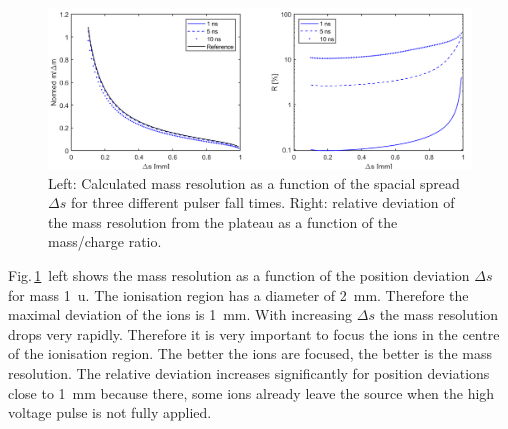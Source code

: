 	\begin{figure}[h!] %
		\centering
		\includegraphics[width=\textwidth]{Bilder/PulseSimPosition.png}
		\caption{Left: Calculated mass resolution as a function of the spacial spread $\Delta s$ for three different pulser fall times. Right: relative deviation of the mass resolution from the plateau as a function of the mass/charge ratio.}
		\label{fig:SimtfallPos}
	\end{figure}
	Fig.\,\ref{fig:SimtfallPos}~left shows the mass resolution as a function of the position deviation $\Delta s$ for mass 1~u. The ionisation region has a diameter of 2~mm. Therefore the maximal deviation of the ions is 1~mm. With increasing $\Delta s$ the mass resolution drops very rapidly. Therefore it is very important to focus the ions in the centre of the ionisation region. The better the ions are focused, the better is the mass resolution. The relative deviation increases significantly for position deviations close to 1~mm because there, some ions already leave the source when the high voltage pulse is not fully applied.\\



